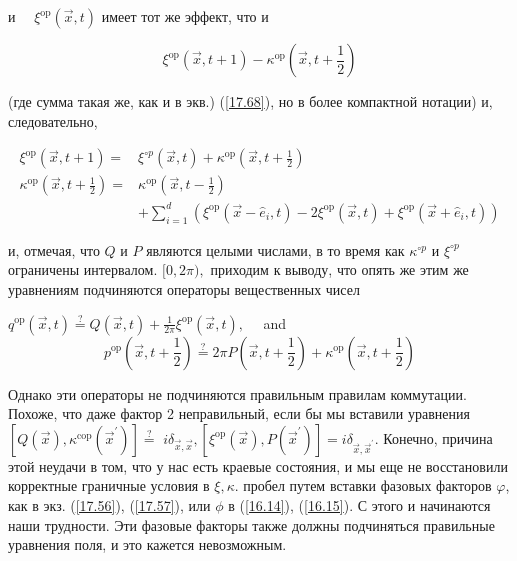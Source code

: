 \documentclass[main.tex]{subfiles}
\begin{document}
и $\quad \xi^{\mathrm{op}}(\vec{x}, t)$ имеет тот же эффект, что и

\begin{equation}\label{17.69}
\xi^{\mathrm{op}}(\vec{x}, t+1)-\kappa^{\mathrm{op}}\left(\vec{x}, t+\frac{1}{2}\right)
\end{equation}

(где сумма такая же, как и в экв.) (\ref{17.68}), но в более компактной нотации) и, следовательно,

\begin{equation}\label{17.71}
\begin{aligned}
\xi^{\mathrm{op}}(\vec{x}, t+1)=& \xi^{\circ p}(\vec{x}, t)+\kappa^{\mathrm{op}}\left(\vec{x}, t+\frac{1}{2}\right) \\
\kappa^{\mathrm{op}}\left(\vec{x}, t+\frac{1}{2}\right)=& \kappa^{\mathrm{op}}\left(\vec{x}, t-\frac{1}{2}\right) \\
&+\sum_{i=1}^{d}\left(\xi^{\mathrm{op}}\left(\vec{x}-\hat{e}_{i}, t\right)-2 \xi^{\mathrm{op}}(\vec{x}, t)+\xi^{\mathrm{op}}\left(\vec{x}+\hat{e}_{i}, t\right)\right)
\end{aligned}
\end{equation}

и, отмечая, что $Q$ и $P$ являются целыми числами, в то время как $\kappa^{\circ p}$ и $\xi^{\circ p}$ ограничены интервалом.
$[0,2 \pi),$ приходим к выводу, что опять же этим же уравнениям подчиняются операторы вещественных чисел

$q^{\mathrm{op}}(\vec{x}, t) \stackrel{?}{=} Q(\vec{x}, t)+\frac{1}{2 \pi} \xi^{\mathrm{op}}(\vec{x}, t), \quad$ and
\begin{equation}\label{17.72}
p^{\mathrm{op}}\left(\vec{x}, t+\frac{1}{2}\right) \stackrel{?}{=} 2 \pi P\left(\vec{x}, t+\frac{1}{2}\right)+\kappa^{\mathrm{op}}\left(\vec{x}, t+\frac{1}{2}\right)
\end{equation}

Однако эти операторы не подчиняются правильным правилам коммутации. Похоже, что даже фактор 2 неправильный, если бы мы вставили уравнения $\left[Q(\vec{x}), \kappa^{\operatorname{cop}}\left(\vec{x}^{\prime}\right)\right] \stackrel{?}{=}$ $i \delta_{\vec{x}, \vec{x}},\left[\xi^{\mathrm{op}}(\vec{x}), P\left(\vec{x}^{\prime}\right)\right]=i \delta_{\vec{x}, \vec{x}^{\prime}}.$ Конечно, причина этой неудачи в том, что у нас есть
краевые состояния, и мы еще не восстановили корректные граничные условия в $\xi,\kappa$.
пробел путем вставки фазовых факторов $\varphi$, как в экз. (\ref{17.56}), (\ref{17.57}), или $\phi$ в (\ref{16.14}),
(\ref{16.15}). С этого и начинаются наши трудности. Эти фазовые факторы также должны подчиняться
правильные уравнения поля, и это кажется невозможным.
\end{document}
